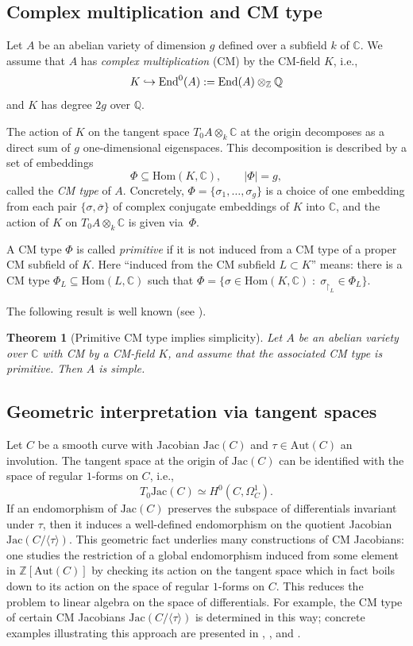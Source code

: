 \documentclass[a4paper,12pt]{amsart}
\newcommand{\ZZ}{{\mathbb Z}}
\newcommand{\CC}{{\mathbb C}}
\newcommand{\QQ}{{\mathbb Q}}
\def\End{{\rm End}}
\numberwithin{equation}{section}
\theoremstyle{plain}
\newtheorem{thm}{Theorem}
\numberwithin{thm}{section}
\begin{document}
 \subsection{Complex multiplication and CM type}

Let $A$ be an abelian variety of dimension $g$ defined over a subfield $k$ of $\CC$. 
We assume that $A$ has \emph{complex multiplication} (CM)  by
the CM-field $K$, i.e.,  
\[
K \hookrightarrow \End^{0}(A) := \End(A)\otimes_{\ZZ}\QQ
\]
and $K$ has degree $2g$ over $\QQ$.

The action of $K$ on the tangent space $T_{0}A \otimes_{k} \CC$ at the origin
decomposes as a direct sum of $g$ one-dimensional eigenspaces. 
This decomposition is described by a set of embeddings
\[
\Phi \subseteq \mbox{Hom}(K,\CC), \qquad |\Phi| = g,
\]
called the \emph{CM type} of $A$.  Concretely, $\Phi=\{\sigma_1,\dots,\sigma_g\}$ is a 
choice of one embedding from each pair $\{\sigma,\overline{\sigma}\}$ of complex conjugate 
embeddings of $K$ into $\CC$, and the action of $K$ on 
$T_{0}A\otimes_k\CC$ is given via~$\Phi$.  

A CM type $\Phi$ is called \emph{primitive} if it is not induced from a CM type of a proper CM subfield of $K$. 
Here ``induced from the CM subfield $L\subset K$'' means:
there is a CM type $\Phi_L\subseteq \text{Hom}(L,\CC)$
such that $\Phi=\{\sigma\in \text{Hom}(K,\CC)\;:\; \sigma_{\restriction_L}\in \Phi_L\}$.

The following result is well known (see \cite[\S8]{ST}).

\begin{thm}[Primitive CM type implies simplicity]\label{thm:primitive-simple}
Let $A$ be an abelian variety over $\CC$ with CM by a CM-field $K$, and assume that the associated CM type is primitive. Then $A$ is simple.
\end{thm}


\subsection{Geometric interpretation via tangent spaces}

Let $C$ be a smooth curve with Jacobian $\textrm{Jac}(C)$ and $\tau \in \mbox{Aut}(C)$ an involution. 
The tangent space at the origin of $\textrm{Jac}(C)$ can be identified 
with the space of regular $1$-forms on $C$, i.e.,
\[
T_0 \textrm{Jac}(C) \simeq H^0(C, \Omega^1_C).
\]
If an endomorphism of $\textrm{Jac}(C)$ preserves the subspace of differentials invariant under $\tau$, then it induces a well-defined endomorphism on the quotient Jacobian $\textrm{Jac}(C/\langle \tau \rangle)$. This geometric fact underlies many constructions of CM Jacobians: 
one studies the restriction of a global endomorphism induced
from some element in $\ZZ[\textrm{Aut}(C)]$ by checking its action on the tangent space which in fact boils down to
its action on the space of regular $1$-forms on $C$.
This reduces the problem to linear algebra on the space of differentials. For example, the
CM type of certain CM Jacobians $\textrm{Jac}(C/\langle\tau\rangle)$
is determined in this way; concrete examples illustrating this approach are
presented in \cite[Proposition~4]{TTV}, \cite[Theorem~5.2.10]{van}, and \cite[Lemmas~4.2.1, 4.2.5]{TTCM}.
\end{document}
